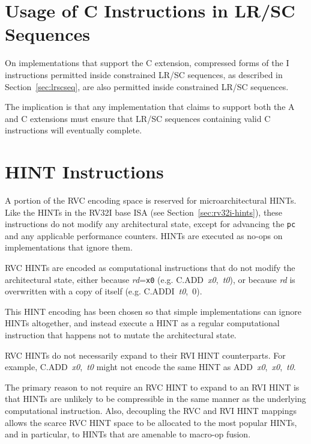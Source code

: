 \section{Usage of C Instructions in LR/SC Sequences}

On implementations that support the C extension, compressed forms of the
I instructions permitted inside constrained LR/SC sequences, as described in
Section~\ref{sec:lrscseq}, are also permitted inside constrained LR/SC
sequences.

\begin{commentary}
The implication is that any implementation that claims to support both
the A and C extensions must ensure that LR/SC sequences containing
valid C instructions will eventually complete.
\end{commentary}

\section{HINT Instructions}
\label{sec:rvc-hints}

A portion of the RVC encoding space is reserved for microarchitectural HINTs.
Like the HINTs in the RV32I base ISA (see Section~\ref{sec:rv32i-hints}),
these instructions do not modify any architectural state, except for advancing
the {\tt pc} and any applicable performance counters.  HINTs are
executed as no-ops on implementations that ignore them.

RVC HINTs are encoded as computational instructions that do not modify the
architectural state, either because {\em rd}={\tt x0}
(e.g. \mbox{C.ADD {\em x0}, {\em t0}}), or because {\em rd} is overwritten
with a copy of itself (e.g. \mbox{C.ADDI {\em t0}, 0}).

\begin{commentary}
This HINT encoding has been chosen so that simple implementations can ignore
HINTs altogether, and instead execute a HINT as a regular computational
instruction that happens not to mutate the architectural state.
\end{commentary}

RVC HINTs do not necessarily expand to their RVI HINT counterparts.  For
example, \mbox{C.ADD {\em x0}, {\em t0}} might not encode the same HINT
as \mbox{ADD {\em x0}, {\em x0}, {\em t0}}.

\begin{commentary}
The primary reason to not require an RVC HINT to expand to an RVI HINT
is that HINTs are unlikely to be compressible in the same manner as
the underlying computational instruction.  Also, decoupling the RVC
and RVI HINT mappings allows the scarce RVC HINT space to be allocated
to the most popular HINTs, and in particular, to HINTs that are
amenable to macro-op fusion.
\end{commentary}

